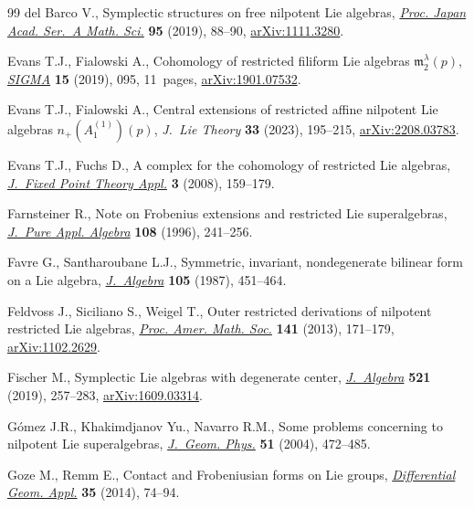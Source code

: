 \documentclass[10pt,a4paper]{amsart}
\numberwithin{equation}{section}
\begin{document}
\begin{thebibliography}{99}
del Barco V., Symplectic structures on free nilpotent {L}ie algebras,
 \href{https://doi.org/10.3792/pjaa.95.88}{\textit{Proc. Japan Acad. Ser.~A Math. Sci.}} \textbf{95} (2019), 88--90,
 \href{https://arxiv.org/abs/1111.3280}{arXiv:1111.3280}.

Evans T.J., Fialowski A., Cohomology of restricted filiform {L}ie algebras
 {${\mathfrak{m}}_2^\lambda(p)$}, \href{https://doi.org/10.3842/SIGMA.2019.095}{\textit{SIGMA}} \textbf{15} (2019), 095,
 11~pages, \href{https://arxiv.org/abs/1901.07532}{arXiv:1901.07532}.

Evans T.J., Fialowski A., Central extensions of restricted affine nilpotent
 {L}ie algebras {$n_+(A^{(1)}_1)(p)$}, \textit{J.~Lie Theory} \textbf{33}
 (2023), 195--215, \href{https://arxiv.org/abs/2208.03783}{arXiv:2208.03783}.

Evans T.J., Fuchs D., A complex for the cohomology of restricted {L}ie
 algebras, \href{https://doi.org/10.1007/s11784-008-0060-y}{\textit{J.~Fixed Point Theory Appl.}} \textbf{3} (2008), 159--179.

Farnsteiner R., Note on {F}robenius extensions and restricted {L}ie
 superalgebras, \href{https://doi.org/10.1016/0022-4049(95)00077-1}{\textit{J.~Pure Appl. Algebra}} \textbf{108} (1996), 241--256.

Favre G., Santharoubane L.J., Symmetric, invariant, nondegenerate bilinear form
 on a {L}ie algebra, \href{https://doi.org/10.1016/0021-8693(87)90209-2}{\textit{J.~Algebra}} \textbf{105} (1987), 451--464.

Feldvoss J., Siciliano S., Weigel T., Outer restricted derivations of nilpotent
 restricted {L}ie algebras, \href{https://doi.org/10.1090/S0002-9939-2012-11316-4}{\textit{Proc. Amer. Math. Soc.}} \textbf{141}
 (2013), 171--179, \href{https://arxiv.org/abs/1102.2629}{arXiv:1102.2629}.

Fischer M., Symplectic {L}ie algebras with degenerate center,
 \href{https://doi.org/10.1016/j.jalgebra.2018.11.038}{\textit{J.~Algebra}} \textbf{521} (2019), 257--283, \href{https://arxiv.org/abs/1609.03314}{arXiv:1609.03314}.

G\'omez J.R., Khakimdjanov Yu., Navarro R.M., Some problems concerning to
 nilpotent {L}ie superalgebras, \href{https://doi.org/10.1016/j.geomphys.2004.01.003}{\textit{J.~Geom. Phys.}} \textbf{51} (2004),
 472--485.

Goze M., Remm E., Contact and {F}robeniusian forms on {L}ie groups,
 \href{https://doi.org/10.1016/j.difgeo.2014.05.008}{\textit{Differential Geom. Appl.}} \textbf{35} (2014), 74--94.


\end{thebibliography}
\end{document}
